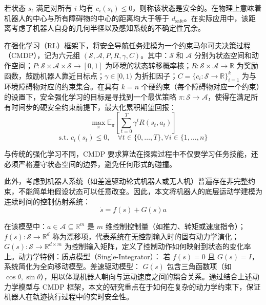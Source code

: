 若状态 $s_t$ 满足对所有 $i$ 均有 $c_i(s_t) \leq 0$，则称该状态是安全的。在物理上意味着机器人的中心与所有障碍物的中心的距离均大于等于 $d_{\text{safe}}$。在实际应用中，该距离考虑了机器人自身的几何半径以及感知系统的不确定性冗余。

在强化学习（RL）框架下，将安全导航任务建模为一个约束马尔可夫决策过程（CMDP），记为六元组 $(\mathcal{S}, \mathcal{A}, P, R, \gamma, C)$。其中：$\mathcal{S}$ 和 $\mathcal{A}$ 分别为状态空间和动作空间；$P: \mathcal{S} \times \mathcal{A} \times \mathcal{S} \rightarrow [0, 1]$ 为环境的状态转移概率核；$R: \mathcal{S} \times \mathcal{A} \rightarrow \mathbb{R}$ 为奖励函数，鼓励机器人靠近目标点；$\gamma \in [0, 1)$ 为折扣因子；$C = \{c_i: \mathcal{S} \rightarrow \mathbb{R}\}_{i=1}^k$ 为与环境障碍物对应的约束集合。在具有 $k=n$ 个硬约束（每个障碍物对应一个约束）的设置下，安全强化学习的目标是寻找到一个最优策略 $\pi: \mathcal{S} \rightarrow \mathcal{A}$，使得在满足所有时间步的硬安全约束前提下，最大化累积期望回报：
\begin{equation}
    \max_{\pi} \mathbb{E}_{\pi}\left[ \sum_{t=0}^{T} \gamma^t R(s_t, a_t) \right]
\end{equation}
\begin{equation}
    \text{s.t. } c_i(s_t) \leq 0, \quad \forall t \in \{0, \dots, T\}, \forall i \in \{1, \dots, n\}
\end{equation}

与传统的强化学习不同，CMDP 要求算法在探索过程中不仅要学习任务技能，还必须严格遵守状态空间的边界，避免任何形式的碰撞。

此外，考虑到机器人系统（如差速驱动轮式机器人或无人机）普遍存在非完整约束，不能简单地假设状态可以任意改变。因此，本文将机器人的底层运动学建模为连续时间的控制仿射系统：
\begin{equation}
    \dot{s} = f(s) + G(s) a
\end{equation}

在该模型中：$a \in \mathcal{A} \subseteq \mathbb{R}^m$ 是 $m$ 维控制控制量（如推力、转矩或速度指令）；$f(s): \mathcal{S} \rightarrow \mathbb{R}^d$ 称为漂移项，代表系统在无控制输入时的固有动力学演化；$G(s): \mathcal{S} \rightarrow \mathbb{R}^{d \times m}$ 为控制输入矩阵，定义了控制动作如何映射到状态的变化率上。动力学特例：质点模型（Single-Integrator）： 若 $f(s) = 0$ 且 $G(s) = I$，系统简化为全向移动模型。差速驱动模型： $G(s)$ 包含三角函数项（如 $\cos\theta, \sin\theta$），用以体现机器人朝向与运动速度之间的耦合关系。通过结合上述动力学模型与 CMDP 框架，本文的研究重点在于如何在复杂的动力学约束下，保证机器人在轨迹执行过程中的实时安全性。

